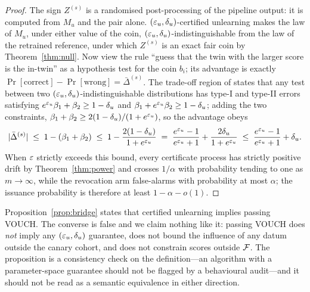 \begin{proof}
The sign $Z^{(s)}$ is a randomised post-processing of the pipeline output: it is
computed from $M_u$ and the pair alone. $(\varepsilon_u,\delta_u)$-certified unlearning makes
the law of $M_u$, under either value of the coin,
$(\varepsilon_u,\delta_u)$-indistinguishable from the law of the retrained reference, under
which $Z^{(s)}$ is an exact fair coin by Theorem~\ref{thm:null}. Now view the rule
``guess that the twin with the larger score is the in-twin'' as a hypothesis test for
the coin $b_i$; its advantage is exactly
$\Pr[\text{correct}] - \Pr[\text{wrong}] = \bar\Delta^{(s)}$. The
trade-off region of \citet{kairouz2015composition} states that any test between two
$(\varepsilon_u,\delta_u)$-indistinguishable distributions has type-I and type-II errors
satisfying $e^{\varepsilon_u}\beta_1 + \beta_2 \ge 1 - \delta_u$ and
$\beta_1 + e^{\varepsilon_u}\beta_2 \ge 1 - \delta_u$; adding the two constraints,
$\beta_1 + \beta_2 \ge 2(1 - \delta_u)/(1 + e^{\varepsilon_u})$, so the advantage obeys
\[
|\bar\Delta^{(s)}| \;\le\; 1 - (\beta_1 + \beta_2)
\;\le\; 1 - \frac{2(1 - \delta_u)}{1 + e^{\varepsilon_u}}
\;=\; \frac{e^{\varepsilon_u} - 1}{e^{\varepsilon_u} + 1} + \frac{2\delta_u}{1 + e^{\varepsilon_u}}
\;\le\; \frac{e^{\varepsilon_u} - 1}{e^{\varepsilon_u} + 1} + \delta_u.
\]
When $\varepsilon$ strictly exceeds this bound, every certificate process has strictly
positive drift by Theorem~\ref{thm:power} and crosses $1/\alpha$ with probability
tending to one as $m \to \infty$, while the revocation arm false-alarms with
probability at most $\alpha$; the issuance probability is therefore at least
$1 - \alpha - o(1)$.
\end{proof}

\begin{remark}\label{rem:onedirection}
Proposition~\ref{prop:bridge} states that certified unlearning implies passing VOUCH.
The converse is false and we claim nothing like it: passing VOUCH does \emph{not}
imply any $(\varepsilon_u,\delta_u)$ guarantee, does not bound the influence of any datum
outside the canary cohort, and does not constrain scores outside $\mathcal{F}$. The
proposition is a consistency check on the definition---an algorithm with a
parameter-space guarantee should not be flagged by a behavioural audit---and it
should not be read as a semantic equivalence in either direction.
\end{remark}

